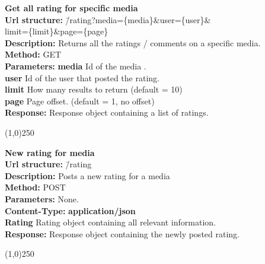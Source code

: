 \documentclass[11pt]{article}
\begin{document}
\begin{tabbing}
\textbf{Get all rating for specific media} \\
\textcolor{black!60}{\textbf{Url structure:}} \hspace{0.2in} \= /rating?media=\{media\}\&user=\{user\}\& \\
\> limit=\{limit\}\&page=\{page\} \\
\textcolor{black!60}{\textbf{Description:}}  \> Returns all the ratings / comments on a specific media. \\
\textcolor{black!60}{\textbf{Method:}} \> GET \\
\textcolor{black!60}{\textbf{Parameters:}} \> \textbf{media} Id of the media . \\
\> \textbf{user} Id of the user that posted the rating. \\
\> \textbf{limit} How many results to return (default = 10) \\
\> \textbf{page} Page offset. (default = 1, no offset) \\
\textcolor{black!60}{\textbf{Response:}} \> Response object containing a list of ratings.
\end{tabbing}

\begin{center}\line(1,0){250}\end{center}

\begin{tabbing}
\textbf{New rating for media} \\
\textcolor{black!60}{\textbf{Url structure:}} \hspace{0.2in} \= /rating \\
\textcolor{black!60}{\textbf{Description:}}  \> Posts a new rating for a media \\
\textcolor{black!60}{\textbf{Method:}} \> POST \\
\textcolor{black!60}{\textbf{Parameters:}} \> None. \\
\textcolor{black!60}{\textbf{Content-Type:}} \> \textbf{application/json} \\
\> \textbf{Rating} Rating object containing all relevant information. \\
\textcolor{black!60}{\textbf{Response:}} \> Response object containing the newly posted rating.
\end{tabbing}

\begin{center}\line(1,0){250}\end{center}
\end{document}
